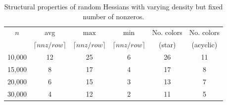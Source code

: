 \documentclass[12pt]{article}
\begin{document}
{\begin{table}[htbp]
\begin{center}
\caption[Structural Properties of Random Hessians with Varying Density but Constant $nnz$ ]
{Structural properties of random Hessians with varying density but fixed number of nonzeros.}
\label{tab:random-sparse}
\begin{tabular}{ | c | c | c | c | c | c |}
\hline
$n$ & avg & $\max$ &  $\min$ & No. colors & No. colors \\
&  $\lceil nnz/row \rceil$ &  $\lceil nnz/row \rceil$ &  $\lceil nnz/row \rceil$ & (star) & (acyclic) \\
\hline
10,000 & 12 & 25 & 6 & 26 & 11 \\
15,000 & 8 & 17 & 4 & 17 & 8 \\
20,000 & 6 & 15 & 3 & 13 & 7 \\
30,000 & 4 & 12 & 2 & 11 & 5 \\
\hline
\end{tabular}
\end{center}
\end{table}



}
\end{document}
